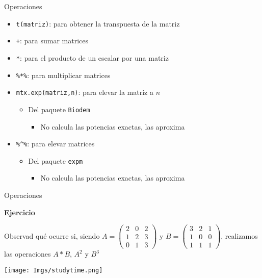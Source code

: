 \documentclass[
  ignorenonframetext,
]{beamer}
\providecommand{\tightlist}{%
  \setlength{\itemsep}{0pt}\setlength{\parskip}{0pt}}
\begin{document}
\begin{frame}[fragile]{Operaciones}
\protect\hypertarget{operaciones}{}

\begin{itemize}
\tightlist
\item
  \texttt{t(matriz)}: para obtener la transpuesta de la matriz
\item
  \texttt{+}: para sumar matrices
\item
  \texttt{*}: para el producto de un escalar por una matriz
\item
  \texttt{\%*\%}: para multiplicar matrices
\item
  \texttt{mtx.exp(matriz,n)}: para elevar la matriz a \(n\)

  \begin{itemize}
  \tightlist
  \item
    Del paquete \texttt{Biodem}

    \begin{itemize}
    \tightlist
    \item
      No calcula las potencias exactas, las aproxima
    \end{itemize}
  \end{itemize}
\item
  \texttt{\%\^{}\%}: para elevar matrices

  \begin{itemize}
  \tightlist
  \item
    Del paquete \texttt{expm}

    \begin{itemize}
    \tightlist
    \item
      No calcula las potencias exactas, las aproxima
    \end{itemize}
  \end{itemize}
\end{itemize}

\end{frame}

\begin{frame}{Operaciones}
\protect\hypertarget{operaciones-1}{}

\textbf{Ejercicio}

Observad qué ocurre si, siendo
\(A = \begin{pmatrix} 2 & 0 & 2\\ 1 & 2 & 3\\ 0 & 1 & 3 \end{pmatrix}\)
y
\(B = \begin{pmatrix} 3 & 2 & 1\\ 1 & 0 & 0\\ 1 & 1 & 1 \end{pmatrix}\),
realizamos las operaciones \(A*B\), \(A^2\) y \(B^3\)

\texttt{[image: Imgs/studytime.png]}

\end{frame}
\end{document}

